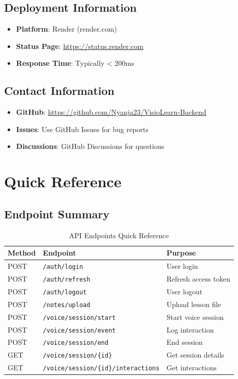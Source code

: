 \documentclass[12pt,a4paper,oneside]{article}
\begin{document}
\subsection{Deployment Information}

\begin{itemize}
    \item \textbf{Platform}: Render (render.com)
    \item \textbf{Status Page}: \url{https://status.render.com}
    \item \textbf{Response Time}: Typically < 200ms
\end{itemize}

\subsection{Contact Information}

\begin{itemize}
    \item \textbf{GitHub}: \url{https://github.com/Nyanja23/VisioLearn-Backend}
    \item \textbf{Issues}: Use GitHub Issues for bug reports
    \item \textbf{Discussions}: GitHub Discussions for questions
\end{itemize}

\appendix

\section{Quick Reference}

\subsection{Endpoint Summary}

\begin{table}[H]
\centering
\small
\begin{tabular}{|l|l|l|}
\hline
\textbf{Method} & \textbf{Endpoint} & \textbf{Purpose} \\
\hline
POST & \texttt{/auth/login} & User login \\
POST & \texttt{/auth/refresh} & Refresh access token \\
POST & \texttt{/auth/logout} & User logout \\
POST & \texttt{/notes/upload} & Upload lesson file \\
POST & \texttt{/voice/session/start} & Start voice session \\
POST & \texttt{/voice/session/event} & Log interaction \\
POST & \texttt{/voice/session/end} & End session \\
GET & \texttt{/voice/session/\{id\}} & Get session details \\
GET & \texttt{/voice/session/\{id\}/interactions} & Get interactions \\
\hline
\end{tabular}
\caption{API Endpoints Quick Reference}
\end{table}
\end{document}
